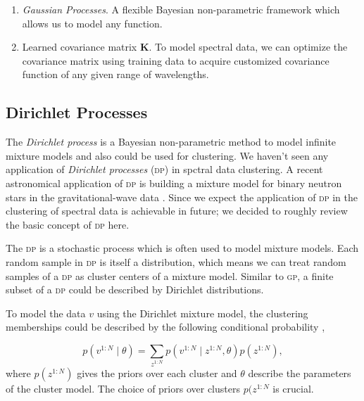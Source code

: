 \documentclass{ar-1col}
\begin{document}
\begin{summary}
    \begin{enumerate}
    \item \textit{Gaussian Processes}. A flexible Bayesian non-parametric framework which allows us to model any function.
    \item Learned covariance matrix $\mathbf{K}$. To model spectral data, we can optimize the covariance matrix using training data to acquire customized covariance function of any given range of wavelengths.
    \end{enumerate}
\end{summary}
    

\subsection{Dirichlet Processes}

The \textit{Dirichlet process} \citep{Teh2006} is a Bayesian non-parametric method to model infinite mixture models and also could be used for clustering. 
We haven't seen any application of \textit{Dirichlet processes} (\textsc{dp}) in spctral data clustering. 
A recent astronomical application of \textsc{dp} is building a mixture model for binary neutron stars in the gravitational-wave data \citep{Pozzo2018}. 
Since we expect the application of \textsc{dp} in the clustering of spectral data is achievable in future; we decided to roughly review the basic concept of \textsc{dp} here.

The \textsc{dp} is a stochastic process which is often used to model mixture models. 
Each random sample in \textsc{dp} is itself a distribution, which means we can treat random samples of a \textsc{dp} as cluster centers of a mixture model. 
Similar to \textsc{gp}, a finite subset of a \textsc{dp} could be described by Dirichlet distributions.

To model the data $v$ using the Dirichlet mixture model,
the clustering memberships could be described by the following conditional probability \citep{Barber2012}, 

\begin{equation}
    p(v^{1:N} \mid \theta) = \sum_{z^{1:N}} p(v^{1:N} \mid z^{1:N}, \theta) p(z^{1:N}),
    \label{eq:indicator}
\end{equation}
where $p(z^{1:N})$ gives the priors over each cluster and $\theta$ describe the parameters of the cluster model. 
The choice of priors over clusters $p(z^{1:N}$ is crucial.
\end{document}
